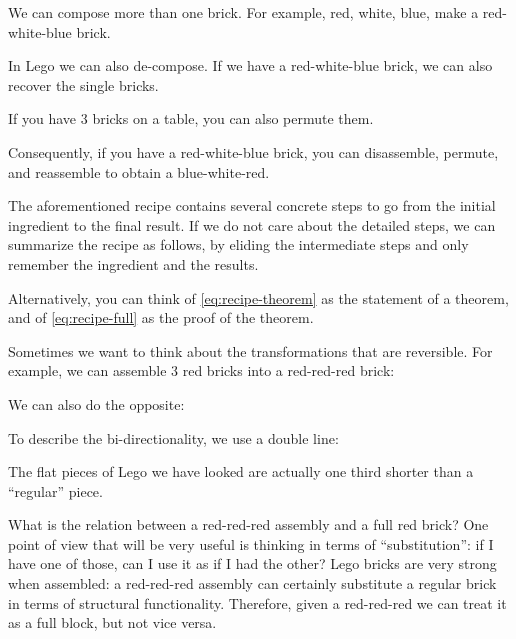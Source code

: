 We can compose more than one brick.
For example, red, white, blue, make a red-white-blue brick.


In Lego we can also de-compose. If we have a red-white-blue brick, we can also recover
the single bricks.


If you have 3 bricks on a table, you can also permute them.


Consequently, if you have a red-white-blue brick, you can disassemble, permute, and reassemble to obtain a blue-white-red.




The aforementioned recipe contains several concrete steps to go from the initial ingredient to the final result.
If we do not care about the detailed steps, we can summarize the recipe as follows, by eliding the intermediate steps and only remember the ingredient and the results.


Alternatively, you can think of \cref{eq:recipe-theorem} as the statement of a theorem, and of \cref{eq:recipe-full} as the proof of the theorem.

Sometimes we want to think about the transformations that are reversible.
For example, we can assemble 3 red bricks into a red-red-red brick:


We can also do the opposite:



To describe the bi-directionality, we use a double line:

 

The flat pieces of Lego we have looked are actually one third shorter than a ``regular'' piece.

 

What is the relation between a red-red-red assembly and a full red brick?
One point of view that will be very useful is thinking in terms of ``substitution'': if I have one of those, can I use it as if I had the other?
Lego bricks are very strong when assembled: a red-red-red assembly can certainly substitute
a regular brick in terms of structural functionality.
Therefore, given a red-red-red we can treat it as a full block, but not vice versa.

